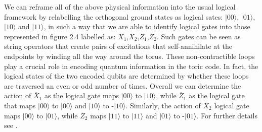 \documentclass{Configuration_Files/PoliMi3i_thesis}
\begin{document}
We can reframe all of the above physical information into the usual logical framework by relabelling the orthogonal ground states as logical sates: $|00\rangle$, $|01\rangle$, $|10\rangle$ and $|11\rangle$, in such a way that we are able to identify logical gates into those represented in figure 2.4 labelled as: $\overline{X}_1$,$\overline{X}_2$,$\overline{Z}_1$,$\overline{Z}_2$. \newline 
Such gates can be seen as string operators that create pairs of excitations that self-annihilate at the endpoints by winding all the way around the torus. 
These non-contractible loops play a crucial role in encoding quantum information in the toric code. In fact, the logical states of the two encoded qubits are determined by whether these loops are traversed an even or odd number of times. \newline
Overall we can determine the action of $\overline{X}_1$ as the logical gate maps $|00\rangle$ to $|10\rangle$, while $\overline{Z}_1$ as the logical gate that maps $|00\rangle$ to $|00\rangle$ and $|10\rangle$ to -$|10\rangle$. \newline
Similarly, the action of $\overline{X}_2$ logical gate maps $|00\rangle$ to $|01\rangle$, while $\overline{Z}_2$ maps $|11\rangle$ to $|11\rangle$ and $|01\rangle$ to -$|01\rangle$. For further details see \cite{Her20}.\newline
\end{document}
